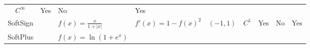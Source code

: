 \documentclass[]{book}
\begin{document}
\begin{longtable}[]{@{}cllllllll@{}}
\begin{minipage}[t]{0.05\columnwidth}
\(C^\infty\)\strut
\end{minipage} & \begin{minipage}[t]{0.03\columnwidth}\raggedright\strut
Yes\strut
\end{minipage} & \begin{minipage}[t]{0.04\columnwidth}\raggedright\strut
No\strut
\end{minipage} & \begin{minipage}[t]{0.05\columnwidth}\raggedright\strut
Yes\strut
\end{minipage}\tabularnewline
\begin{minipage}[t]{0.06\columnwidth}\centering\strut
SoftSign\strut
\end{minipage} & \begin{minipage}[t]{0.01\columnwidth}\raggedright\strut
\strut
\end{minipage} & \begin{minipage}[t]{0.27\columnwidth}\raggedright\strut
\(f(x)= \frac{x}{1+|x|}\)\strut
\end{minipage} & \begin{minipage}[t]{0.19\columnwidth}\raggedright\strut
\(f'(x)=1-f(x)^2\)\strut
\end{minipage} & \begin{minipage}[t]{0.06\columnwidth}\raggedright\strut
\((-1,1)\)\strut
\end{minipage} & \begin{minipage}[t]{0.05\columnwidth}\raggedright\strut
\(C^1\)\strut
\end{minipage} & \begin{minipage}[t]{0.03\columnwidth}\raggedright\strut
Yes\strut
\end{minipage} & \begin{minipage}[t]{0.04\columnwidth}\raggedright\strut
No\strut
\end{minipage} & \begin{minipage}[t]{0.05\columnwidth}\raggedright\strut
Yes\strut
\end{minipage}\tabularnewline
\begin{minipage}[t]{0.06\columnwidth}\centering\strut
SoftPlus\strut
\end{minipage} & \begin{minipage}[t]{0.01\columnwidth}\raggedright\strut
\strut
\end{minipage} & \begin{minipage}[t]{0.27\columnwidth}\raggedright\strut
\(\displaystyle f(x)=\ln(1+e^{x})\)\strut
\end{minipage} & \begin{minipage}[t]{0.19\columnwidth}\raggedright\strut

\end{minipage}
\end{longtable}
\end{document}

